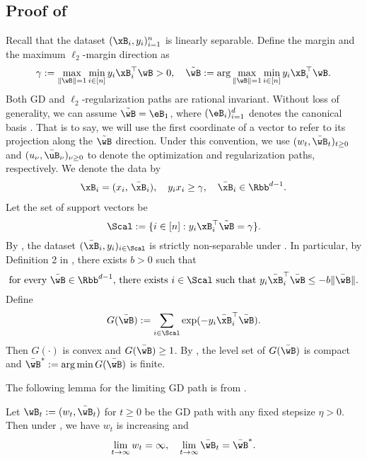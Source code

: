 \documentclass[11pt]{article}
\begin{document}
\subsection{Proof of \texorpdfstring{}{Theorem 5.2}}\label{sec:proof:path:point-wise-distance}
Recall that the dataset $(\xB_i, y_i)_{i=1}^n$ is linearly separable.
Define the margin and the maximum $\ell_2$-margin direction as
\begin{align*}
    \gamma := \max_{\|\wB\|=1}\min_{i\in[n]} y_i\xB_i^\top \wB > 0,\quad \tilde\wB :=  \arg\max_{\|\wB\|=1}\min_{i\in[n]} y_i\xB_i^\top \wB.
\end{align*}
Both GD and $\ell_2$-regularization paths are rational invariant.
Without loss of generality, we can assume $\tilde\wB = \eB_1$, where $(\eB_i)_{i=1}^d$ denotes the canonical basis \citep{wu2023implicit}.
That is to say, we will use the first coordinate of a vector to refer to its projection along the $\tilde\wB$ direction. 
Under this convention, we use $(w_t, \bar \wB_t)_{t\ge 0}$ and $(u_\nu, \bar \uB_\nu)_{\nu \ge 0}$ to denote the optimization and regularization paths, respectively.
We denote the data by 
\begin{align*}
    \xB_i = (
        x_i,\,
        \bar \xB_i),\quad y_i x_i \ge \gamma,\quad \bar \xB_i \in \Rbb^{d-1}. 
\end{align*}
Let the set of support vectors be
\[
\Scal := \{i\in[n]: y_i\xB_i^\top\tilde\wB=\gamma \}.
\]
By \cite{wu2023implicit}, the dataset $(\bar\xB_i, y_i)_{i\in\Scal}$ is strictly non-separable under . In particular, by Definition 2 in \citep{wu2023implicit}, there exists $b>0$ such that
\begin{equation}\label{eq:path:non-separable}
    \text{for every $\bar\wB\in\Rbb^{d-1}$, there exists $i\in\Scal$ such that}\ y_i\bar\xB_i^\top\bar\wB \le -b \|\bar\wB\|.
\end{equation}
Define 
\begin{equation*}
    G(\bar \wB):= \sum_{i\in \Scal}\exp(- y_i \bar \xB_i^\top \bar \wB).
\end{equation*}
Then $G(\cdot)$ is convex and $G(\bar \wB)\ge 1$.
By , the level set of $G(\bar \wB)$ is compact and $\bar \wB^*:= \arg \min G(\bar \wB)$ is finite.

The following lemma for the limiting GD path is from \citep{wu2023implicit}.
\begin{lemma}
Let $\wB_t := (w_t, \bar \wB_t)$ for $t\ge 0$ be the GD path with any fixed stepsize $\eta>0$.
Then under , we have $w_t$ is increasing and 
\begin{align*}
    \lim_{t\to\infty} w_t = \infty,\quad 
    \lim_{t\to\infty} \bar \wB_t = \bar \wB^*.
\end{align*}
\end{lemma}
\end{document}
